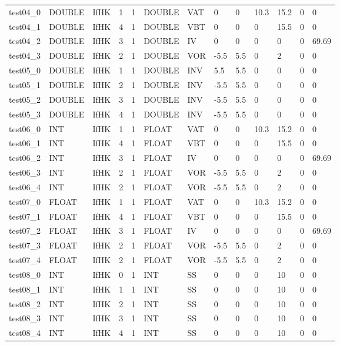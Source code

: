 \begin{longtable}{|l|l|l|p{0.5cm}|p{0.5cm}|l|p{0.5cm}|p{0.5cm}|p{0.5cm}|l|l|p{0.5cm}|l|}
test04\_0 & DOUBLE & IfHK & 1 & 1 & DOUBLE & VAT & 0 & 0 & 10.3 & 15.2 & 0 & 0 \\
test04\_1 & DOUBLE & IfHK & 4 & 1 & DOUBLE & VBT & 0 & 0 & 0 & 15.5 & 0 & 0 \\
test04\_2 & DOUBLE & IfHK & 3 & 1 & DOUBLE & IV & 0 & 0 & 0 & 0 & 0 & 69.69 \\
test04\_3 & DOUBLE & IfHK & 2 & 1 & DOUBLE & VOR & -5.5 & 5.5 & 0 & 2 & 0 & 0 \\
test05\_0 & DOUBLE & IfHK & 1 & 1 & DOUBLE & INV & 5.5 & 5.5 & 0 & 0 & 0 & 0 \\
test05\_1 & DOUBLE & IfHK & 2 & 1 & DOUBLE & INV & -5.5 & 5.5 & 0 & 0 & 0 & 0 \\
test05\_2 & DOUBLE & IfHK & 3 & 1 & DOUBLE & INV & -5.5 & 5.5 & 0 & 0 & 0 & 0 \\
test05\_3 & DOUBLE & IfHK & 4 & 1 & DOUBLE & INV & -5.5 & 5.5 & 0 & 0 & 0 & 0 \\
test06\_0 & INT & IfHK & 1 & 1 & FLOAT & VAT & 0 & 0 & 10.3 & 15.2 & 0 & 0 \\
test06\_1 & INT & IfHK & 4 & 1 & FLOAT & VBT & 0 & 0 & 0 & 15.5 & 0 & 0 \\
test06\_2 & INT & IfHK & 3 & 1 & FLOAT & IV & 0 & 0 & 0 & 0 & 0 & 69.69 \\
test06\_3 & INT & IfHK & 2 & 1 & FLOAT & VOR & -5.5 & 5.5 & 0 & 2 & 0 & 0 \\
test06\_4 & INT & IfHK & 2 & 1 & FLOAT & VOR & -5.5 & 5.5 & 0 & 2 & 0 & 0 \\
test07\_0 & FLOAT & IfHK & 1 & 1 & FLOAT & VAT & 0 & 0 & 10.3 & 15.2 & 0 & 0 \\
test07\_1 & FLOAT & IfHK & 4 & 1 & FLOAT & VBT & 0 & 0 & 0 & 15.5 & 0 & 0 \\
test07\_2 & FLOAT & IfHK & 3 & 1 & FLOAT & IV & 0 & 0 & 0 & 0 & 0 & 69.69 \\
test07\_3 & FLOAT & IfHK & 2 & 1 & FLOAT & VOR & -5.5 & 5.5 & 0 & 2 & 0 & 0 \\
test07\_4 & FLOAT & IfHK & 2 & 1 & FLOAT & VOR & -5.5 & 5.5 & 0 & 2 & 0 & 0 \\
test08\_0 & INT & IfHK & 0 & 1 & INT & SS & 0 & 0 & 0 & 10 & 0 & 0 \\
test08\_1 & INT & IfHK & 1 & 1 & INT & SS & 0 & 0 & 0 & 10 & 0 & 0 \\
test08\_2 & INT & IfHK & 2 & 1 & INT & SS & 0 & 0 & 0 & 10 & 0 & 0 \\
test08\_3 & INT & IfHK & 3 & 1 & INT & SS & 0 & 0 & 0 & 10 & 0 & 0 \\
test08\_4 & INT & IfHK & 4 & 1 & INT & SS & 0 & 0 & 0 & 10 & 0 & 0 \\

\end{longtable}
